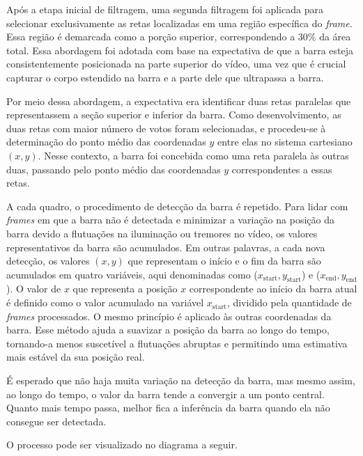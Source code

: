 Após a etapa inicial de filtragem, uma segunda filtragem foi aplicada para selecionar exclusivamente as retas localizadas em uma região específica do \textit{frame}. Essa região é demarcada como a porção superior, correspondendo a 30\% da área total. Essa abordagem foi adotada com base na expectativa de que a barra esteja consistentemente posicionada na parte superior do vídeo, uma vez que é crucial capturar o corpo estendido na barra e a parte dele que ultrapassa a barra.

Por meio dessa abordagem, a expectativa era identificar duas retas paralelas que representassem a seção superior e inferior da barra. Como desenvolvimento, as duas retas com maior número de votos foram selecionadas, e procedeu-se à determinação do ponto médio das coordenadas $y$ entre elas no sistema cartesiano $(x, y)$. Nesse contexto, a barra foi concebida como uma reta paralela às outras duas, passando pelo ponto médio das coordenadas $y$ correspondentes a essas retas.

A cada quadro, o procedimento de detecção da barra é repetido. Para lidar com \textit{frames} em que a barra não é detectada e minimizar a variação na posição da barra devido a flutuações na iluminação ou tremores no vídeo, os valores representativos da barra são acumulados. Em outras palavras, a cada nova detecção, os valores $(x, y)$ que representam o início e o fim da barra são acumulados em quatro variáveis, aqui denominadas como ($x_{\text{start}}, y_{\text{start}}$) e ($x_{\text{end}}, y_{\text{end}}$). O valor de $x$ que representa a posição $x$ correspondente ao início da barra atual é definido como o valor acumulado na variável $x_{\text{start}}$, dividido pela quantidade de \textit{frames} processados. O mesmo princípio é aplicado às outras coordenadas da barra. Esse método ajuda a suavizar a posição da barra ao longo do tempo, tornando-a menos suscetível a flutuações abruptas e permitindo uma estimativa mais estável da sua posição real.

É esperado que não haja muita variação na detecção da barra, mas mesmo assim, ao longo do tempo, o valor da barra tende a convergir a um ponto central. Quanto mais tempo passa, melhor fica a inferência da barra quando ela não consegue ser detectada.

O processo pode ser visualizado no diagrama a seguir.


